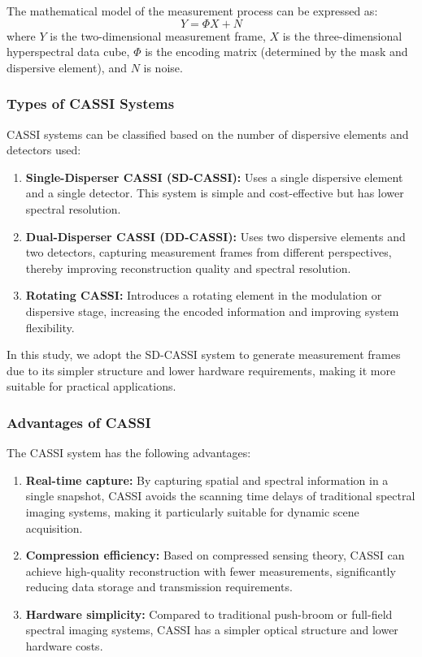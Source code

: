 \documentclass[preprint,review,12pt]{elsarticle}
\begin{document}
The mathematical model of the measurement process can be expressed as:
\begin{equation}
Y = \Phi X + N
\end{equation}
where $Y$ is the two-dimensional measurement frame, $X$ is the three-dimensional hyperspectral data cube, $\Phi$ is the encoding matrix (determined by the mask and dispersive element), and $N$ is noise.

\subsubsection{Types of CASSI Systems}

CASSI systems can be classified based on the number of dispersive elements and detectors used:

\begin{enumerate}
	\item \textbf{Single-Disperser CASSI (SD-CASSI):} Uses a single dispersive element and a single detector. This system is simple and cost-effective but has lower spectral resolution.
	\item \textbf{Dual-Disperser CASSI (DD-CASSI):} Uses two dispersive elements and two detectors, capturing measurement frames from different perspectives, thereby improving reconstruction quality and spectral resolution.
	\item \textbf{Rotating CASSI:} Introduces a rotating element in the modulation or dispersive stage, increasing the encoded information and improving system flexibility.
\end{enumerate}

In this study, we adopt the SD-CASSI system to generate measurement frames due to its simpler structure and lower hardware requirements, making it more suitable for practical applications.

\subsubsection{Advantages of CASSI}

The CASSI system has the following advantages:

\begin{enumerate}
	\item \textbf{Real-time capture:} By capturing spatial and spectral information in a single snapshot, CASSI avoids the scanning time delays of traditional spectral imaging systems, making it particularly suitable for dynamic scene acquisition.
	\item \textbf{Compression efficiency:} Based on compressed sensing theory, CASSI can achieve high-quality reconstruction with fewer measurements, significantly reducing data storage and transmission requirements.
	\item \textbf{Hardware simplicity:} Compared to traditional push-broom or full-field spectral imaging systems, CASSI has a simpler optical structure and lower hardware costs.
\end{enumerate}
\end{document}
